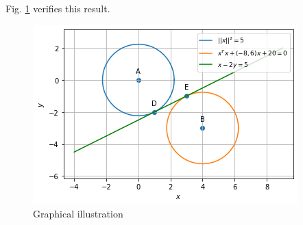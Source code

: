 Fig.     \ref{4/2/15/fig} verifies this result.
%
\begin{figure}[htp]
    \centering 
    \includegraphics[width = \columnwidth]{solutions/4/2/15/a_3.png}
    \caption{Graphical illustration}
    \label{4/2/15/fig}
\end{figure}

